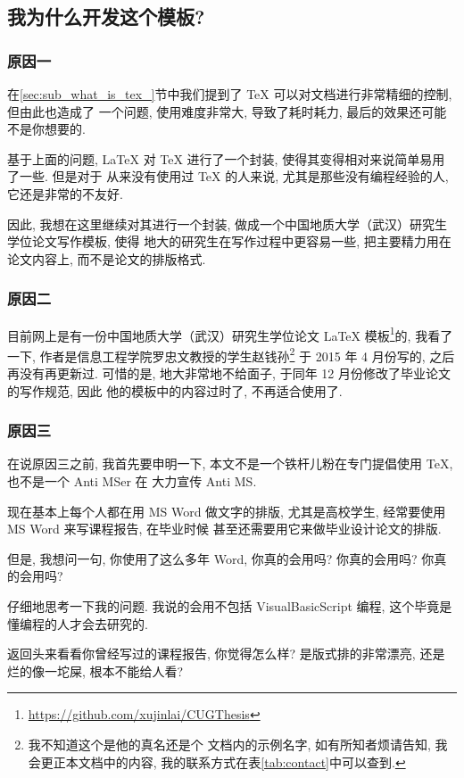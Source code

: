 \documentclass[bibsec, doctor]{cugthesis}
\begin{document}
\subsection{我为什么开发这个模板?}
\subsubsection{原因一}
    在\ref{sec:sub_what_is_tex_}节中我们提到了 \TeX{} 可以对文档进行非常精细的控制, 但由此也造成了
    一个问题, 使用难度非常大, 导致了耗时耗力, 最后的效果还可能不是你想要的. 

    基于上面的问题, \LaTeX{} 对 \TeX{} 进行了一个封装, 使得其变得相对来说简单易用了一些. 但是对于
    从来没有使用过 \TeX{} 的人来说, 尤其是那些没有编程经验的人, 它还是非常的不友好. 

    因此, 我想在这里继续对其进行一个封装, 做成一个中国地质大学（武汉）研究生学位论文写作模板, 使得
    地大的研究生在写作过程中更容易一些, 把主要精力用在论文内容上, 而不是论文的排版格式. 

\subsubsection{原因二}
    目前网上是有一份中国地质大学（武汉）研究生学位论文 \LaTeX{} 模板\footnote{\url{https://github.com/xujinlai/CUGThesis}}的, 
    我看了一下, 作者是信息工程学院罗忠文教授的学生赵钱孙\footnote{我不知道这个是他的真名还是个
    文档内的示例名字, 如有所知者烦请告知, 我会更正本文档中的内容, 我的联系方式在表\ref{tab:contact}中可以查到. }
    于 2015 年 4 月份写的, 之后再没有再更新过. 可惜的是, 地大非常地不给面子, 于同年 12 月份修改了毕业论文的写作规范, 因此
    他的模板中的内容过时了, 不再适合使用了.
    
\subsubsection{原因三}
    在说原因三之前, 我首先要申明一下, 本文不是一个铁杆儿粉在专门提倡使用 \TeX{}, 也不是一个 Anti MSer 在
    大力宣传 Anti MS. 

    现在基本上每个人都在用 MS Word 做文字的排版, 尤其是高校学生, 经常要使用 MS Word 来写课程报告, 在毕业时候
    甚至还需要用它来做毕业设计论文的排版. 

    但是, 我想问一句, 你使用了这么多年 Word, 你真的会用吗? 你真的会用吗? 你真的会用吗? 

    仔细地思考一下我的问题. 我说的会用不包括 VisualBasicScript 编程, 这个毕竟是懂编程的人才会去研究的.

    返回头来看看你曾经写过的课程报告, 你觉得怎么样? 是版式排的非常漂亮, 还是烂的像一坨屎, 根本不能给人看?
\end{document}
